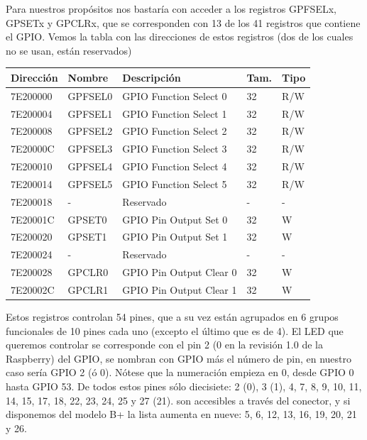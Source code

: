 Para nuestros propósitos nos bastaría con acceder a los registros GPFSELx, GPSETx y GPCLRx,
que se corresponden con 13 de los 41 registros que contiene el GPIO. Vemos la tabla con las
direcciones de estos registros (dos de los cuales no se usan, están reservados)

\begin{longtable}{ p{1.8cm} | p{2cm} | p{5cm} | p{1cm} | p{1cm} }
\hline
{\bf Dirección} & {\bf Nombre} & {\bf Descripción} & {\bf Tam.} & {\bf Tipo} \\ \hline
7E200000 & GPFSEL0 & GPIO Function Select 0 & 32 & R/W \\ \hline
7E200004 & GPFSEL1 & GPIO Function Select 1 & 32 & R/W \\ \hline
7E200008 & GPFSEL2 & GPIO Function Select 2 & 32 & R/W \\ \hline
7E20000C & GPFSEL3 & GPIO Function Select 3 & 32 & R/W \\ \hline
7E200010 & GPFSEL4 & GPIO Function Select 4 & 32 & R/W \\ \hline
7E200014 & GPFSEL5 & GPIO Function Select 5 & 32 & R/W \\ \hline
7E200018 & -       & Reservado              & -  & -   \\ \hline
7E20001C & GPSET0  & GPIO Pin Output Set 0  & 32 & W   \\ \hline
7E200020 & GPSET1  & GPIO Pin Output Set 1  & 32 & W   \\ \hline
7E200024 & -       & Reservado              & -  & -   \\ \hline
7E200028 & GPCLR0  & GPIO Pin Output Clear 0 & 32 & W  \\ \hline
7E20002C & GPCLR1  & GPIO Pin Output Clear 1 & 32 & W  \\ \hline
\end{longtable}

Estos registros controlan 54 pines, que a su vez están agrupados
en 6 grupos funcionales de 10 pines cada uno (excepto el último
que es de 4). El LED que queremos controlar se corresponde con el
pin 2 (0 en la revisión 1.0 de la Raspberry) del GPIO, se nombran con
GPIO más el número de pin, en nuestro caso sería GPIO 2 (ó 0). Nótese
que la numeración empieza en 0, desde GPIO 0 hasta GPIO 53. De
todos estos pines sólo diecisiete: 2 (0), 3 (1), 4, 7, 8, 9, 10, 11, 14, 15, 17, 18, 22, 23, 24, 25 y 27 (21).
son accesibles a través del conector, y si disponemos del modelo B+ la lista
aumenta en nueve: 5, 6, 12, 13, 16, 19, 20, 21 y 26.

